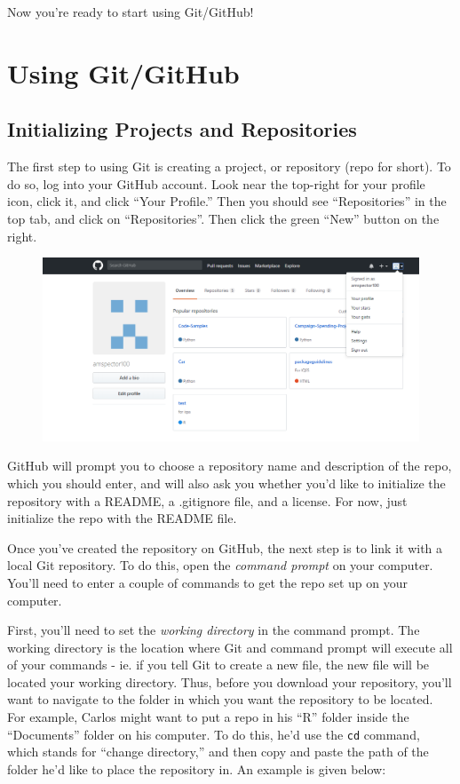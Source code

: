 \documentclass[]{book}
\begin{document}
Now you're ready to start using Git/GitHub!

\section{Using Git/GitHub}\label{using-gitgithub}

\subsection{Initializing Projects and
Repositories}\label{initializing-projects-and-repositories}

The first step to using Git is creating a project, or repository (repo
for short). To do so, log into your GitHub account. Look near the
top-right for your profile icon, click it, and click ``Your Profile.''
Then you should see ``Repositories'' in the top tab, and click on
``Repositories''. Then click the green ``New'' button on the right.

\begin{figure}
\centering
\includegraphics{images/gitdashboard.PNG}
\caption{}
\end{figure}

GitHub will prompt you to choose a repository name and description of
the repo, which you should enter, and will also ask you whether you'd
like to initialize the repository with a README, a .gitignore file, and
a license. For now, just initialize the repo with the README file.

Once you've created the repository on GitHub, the next step is to link
it with a local Git repository. To do this, open the \emph{command
prompt} on your computer. You'll need to enter a couple of commands to
get the repo set up on your computer.

First, you'll need to set the \emph{working directory} in the command
prompt. The working directory is the location where Git and command
prompt will execute all of your commands - ie. if you tell Git to create
a new file, the new file will be located your working directory. Thus,
before you download your repository, you'll want to navigate to the
folder in which you want the repository to be located. For example,
Carlos might want to put a repo in his ``R'' folder inside the
``Documents'' folder on his computer. To do this, he'd use the
\texttt{cd} command, which stands for ``change directory,'' and then
copy and paste the path of the folder he'd like to place the repository
in. An example is given below:
\end{document}
